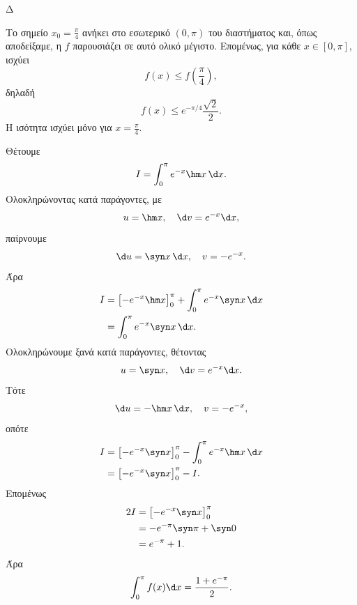\begin{thema}{Δ}
\begin{erwthma}
\item Το σημείο $x_0=\frac{\pi}{4}$ ανήκει στο εσωτερικό $(0,\pi)$ του διαστήματος και, όπως αποδείξαμε, η $f$ παρουσιάζει σε αυτό ολικό μέγιστο. Επομένως, για κάθε $x\in[0,\pi]$, ισχύει
\[
f(x)\leq f\left(\frac{\pi}{4}\right),
\]
δηλαδή
\[
{f(x)\leq e^{-\pi/4}\frac{\sqrt{2}}{2}}.
\]
Η ισότητα ισχύει μόνο για $x=\frac{\pi}{4}$.

\item Θέτουμε
\[
I=\int_0^\pi e^{-x}\hm x\,\d x.
\]
Ολοκληρώνοντας κατά παράγοντες, με
\[
u=\hm x,\quad \d v=e^{-x}\d x,
\]
παίρνουμε
\[
\d u=\syn x\,\d x,\quad v=-e^{-x}.
\]
Άρα
\begin{align*}
I
&=\left[-e^{-x}\hm x\right]_0^\pi
+\int_0^\pi e^{-x}\syn x\,\d x\\
&=\int_0^\pi e^{-x}\syn x\,\d x.
\end{align*}
Ολοκληρώνουμε ξανά κατά παράγοντες, θέτοντας
\[
u=\syn x,\quad \d v=e^{-x}\d x.
\]
Τότε
\[
\d u=-\hm x\,\d x,\quad v=-e^{-x},
\]
οπότε
\begin{align*}
I
&=\left[-e^{-x}\syn x\right]_0^\pi
-\int_0^\pi e^{-x}\hm x\,\d x\\
&=\left[-e^{-x}\syn x\right]_0^\pi-I.
\end{align*}
Επομένως
\begin{align*}
2I
&=\left[-e^{-x}\syn x\right]_0^\pi\\
&=-e^{-\pi}\syn\pi+\syn0\\
&=e^{-\pi}+1.
\end{align*}
Άρα
\[
{\int_0^\pi f(x)\d x=\frac{1+e^{-\pi}}{2}}.
\]
\end{erwthma}
\end{thema}

